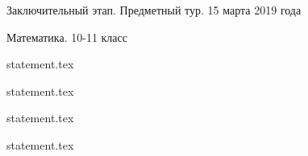 \documentclass[a4paper,11pt, oneside]{book}
\begin{document}
\vspace{-3mm}
\vspace{-5mm}

\normalsize

\begin{center}
    Заключительный этап. Предметный тур. 15 марта 2019 года
    
    Математика. 10-11 класс
\end{center}

\parindent=0cm

{statement.tex}

\clearpage

{statement.tex}

{statement.tex}

{statement.tex}
\end{document}
